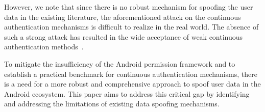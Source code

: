 However, we note that since there is no robust mechanism for spoofing the user data in the existing literature, the aforementioned attack on the continuous authentication mechanisms is difficult to realize in the real world. The absence of such a strong attack has resulted in the wide acceptance of weak continuous authentication methods~\cite{kolokas2019gait, sun2018artificial, thang2012gait, hoang2013adaptive, shih2015flick, nohara2016personal, lu2015safeguard, jain2015exploring, nixon2016slowmo, feng2014tips, abuhamad2020autosen, amini2018deepauth, li2018using, yan2018towards, song2016eyeveri, xia2018motionhacker, hong2016mgra, hong2015waving, miguel2016interaction, zhang2016voicelive, wang2019voicepop, johnson2013secure, khamis2016gazetouchpass, zhu2013sensec, sitova2015hmog, pang2019mineauth, acien2019multilock, zhu2019riskcog, lee2017implicit}.

To mitigate the insufficiency of the Android permission framework and to establish a practical benchmark for continuous authentication mechanisms, there is a need for a more robust and comprehensive approach to spoof user data in the Android ecosystem. This paper aims to address this critical gap by identifying and addressing the limitations of existing data spoofing mechanisms.